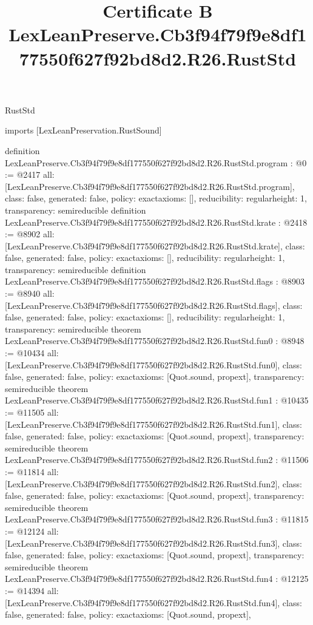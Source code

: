 \begin{lexlean}{RustStd}
\title{Certificate B LexLeanPreserve.Cb3f94f79f9e8df177550f627f92bd8d2.R26.RustStd}
\begin{coremodule}
imports [LexLeanPreservation.RustSound]

definition LexLeanPreserve.Cb3f94f79f9e8df177550f627f92bd8d2.R26.RustStd.program : @0 := @2417 {
  all: [LexLeanPreserve.Cb3f94f79f9e8df177550f627f92bd8d2.R26.RustStd.program],
  class: false,
  generated: false,
  policy: exact{axioms: []},
  reducibility: regular{height: 1},
  transparency: semireducible
}
definition LexLeanPreserve.Cb3f94f79f9e8df177550f627f92bd8d2.R26.RustStd.krate : @2418 := @8902 {
  all: [LexLeanPreserve.Cb3f94f79f9e8df177550f627f92bd8d2.R26.RustStd.krate],
  class: false,
  generated: false,
  policy: exact{axioms: []},
  reducibility: regular{height: 1},
  transparency: semireducible
}
definition LexLeanPreserve.Cb3f94f79f9e8df177550f627f92bd8d2.R26.RustStd.flags : @8903 := @8940 {
  all: [LexLeanPreserve.Cb3f94f79f9e8df177550f627f92bd8d2.R26.RustStd.flags],
  class: false,
  generated: false,
  policy: exact{axioms: []},
  reducibility: regular{height: 1},
  transparency: semireducible
}
theorem LexLeanPreserve.Cb3f94f79f9e8df177550f627f92bd8d2.R26.RustStd.fun0 : @8948 := @10434 {
  all: [LexLeanPreserve.Cb3f94f79f9e8df177550f627f92bd8d2.R26.RustStd.fun0],
  class: false,
  generated: false,
  policy: exact{axioms: [Quot.sound, propext]},
  transparency: semireducible
}
theorem LexLeanPreserve.Cb3f94f79f9e8df177550f627f92bd8d2.R26.RustStd.fun1 : @10435 := @11505 {
  all: [LexLeanPreserve.Cb3f94f79f9e8df177550f627f92bd8d2.R26.RustStd.fun1],
  class: false,
  generated: false,
  policy: exact{axioms: [Quot.sound, propext]},
  transparency: semireducible
}
theorem LexLeanPreserve.Cb3f94f79f9e8df177550f627f92bd8d2.R26.RustStd.fun2 : @11506 := @11814 {
  all: [LexLeanPreserve.Cb3f94f79f9e8df177550f627f92bd8d2.R26.RustStd.fun2],
  class: false,
  generated: false,
  policy: exact{axioms: [Quot.sound, propext]},
  transparency: semireducible
}
theorem LexLeanPreserve.Cb3f94f79f9e8df177550f627f92bd8d2.R26.RustStd.fun3 : @11815 := @12124 {
  all: [LexLeanPreserve.Cb3f94f79f9e8df177550f627f92bd8d2.R26.RustStd.fun3],
  class: false,
  generated: false,
  policy: exact{axioms: [Quot.sound, propext]},
  transparency: semireducible
}
theorem LexLeanPreserve.Cb3f94f79f9e8df177550f627f92bd8d2.R26.RustStd.fun4 : @12125 := @14394 {
  all: [LexLeanPreserve.Cb3f94f79f9e8df177550f627f92bd8d2.R26.RustStd.fun4],
  class: false,
  generated: false,
  policy: exact{axioms: [Quot.sound, propext]},
}
\end{coremodule}
\end{lexlean}
